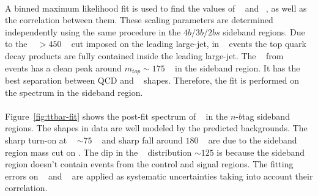\paragraph{}
A binned maximum likelihood fit is used to find the values of \muqcd~ and \alphatt~, as well as the correlation between them.
These scaling parameters are determined independently using the same procedure in the $4b/3b/2bs$ sideband regions.
Due to the \pt~ $>450$ \GeV~ cut imposed on the leading large-\R jet, in \ttbar~ events the top quark decay products are fully contained inside the leading large-\R jet. 
The \mleadJ~ from \ttbar~ events has a clean peak around $m_{top} \sim 175$ \GeV~ in the sideband region.
It has the best separation between QCD and \ttbar~ shapes.
Therefore, the fit is performed on the \mleadJ spectrum in the sideband region.

\paragraph{}
Figure~\ref{fig:ttbar-fit} shows the post-fit spectrum of \mleadJ~ in the $n$-$b$tag sideband regions.
The \mleadJ shapes in data are well modeled by the predicted backgrounds.
The sharp turn-on at \mleadJ~ $\sim 75$ \GeV~ and sharp fall around $180$ \GeV~ are due to the sideband region mass cut on \mleadJ.
The dip in the \mleadJ~ distribution $\sim 125$ is because the sideband region doesn't contain events from the control and signal regions.
The fitting errors on \muqcd~ and \alphatt~ are applied as systematic uncertainties taking into account their correlation.

